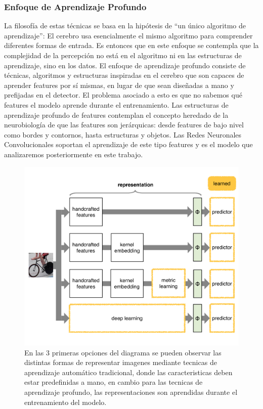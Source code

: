 \documentclass[a4paper,11pt,spanish]{book}
\begin{document}
      \subsubsection{Enfoque de Aprendizaje Profundo}
	La filosofía de estas técnicas se basa en la hipótesis de “un único algoritmo de aprendizaje”: El cerebro usa esencialmente el mismo algoritmo para comprender diferentes formas de entrada.
	Es entonces que en este enfoque se contempla que la complejidad de la percepción no está en el algoritmo ni en las estructuras de aprendizaje, sino en los datos.
	El enfoque de aprendizaje profundo consiste de técnicas, algoritmos y estructuras inspiradas en el cerebro que son capaces de aprender features por sí mismas,
	en lugar de que sean diseñadas a mano y prefijadas en el detector. El problema asociado a esto es que no sabemos qué features el modelo aprende durante el entrenamiento.
	Las estructuras de aprendizaje profundo de features contemplan el concepto heredado de la neurobiología de que las features son jerárquicas:
	desde features de bajo nivel como bordes y contornos, hasta estructuras y objetos. Las Redes Neuronales Convolucionales soportan el aprendizaje de este tipo features
	y es el modelo que analizaremos posteriormente en este trabajo.\\
	\begin{figure}[h!]
	  \begin{center}
		  \includegraphics[width=0.9\linewidth]{./img/vedaldi_shallow_deep.pdf}
	  \caption{En las 3 primeras opciones del diagrama se pueden observar las distintas formas de representar imagenes mediante tecnicas de aprendizaje automático tradicional,
	  donde las caracteristicas deben estar predefinidas a mano, en cambio para las tecnicas de aprendizaje profundo, las representaciones son aprendidas durante el entrenamiento
	  del modelo.}
	  \label{fig:shallow_deep}
	  \end{center}
	\end{figure}
\end{document}
